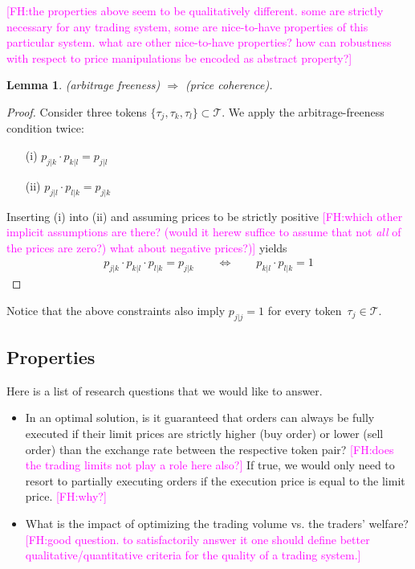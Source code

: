 \documentclass[11pt,parskip=full]{scrartcl}%
\newcommand*{\tokens}{\mathcal{T}}          %
\newtheorem{lemma}[theorem]{Lemma}
\newcommand{\FH}[1]{\textcolor{magenta}{[FH:#1]}}
\begin{document}
\FH{the properties above seem to be qualitatively different. some are strictly necessary for any trading system, some are nice-to-have properties of this particular system. what are other nice-to-have properties? how can robustness with respect to price manipulations be encoded as abstract property?}

\vspace{.6cm}
\begin{lemma}
  (arbitrage freeness) $ \Rightarrow $ (price coherence).
\end{lemma}
\vspace{-.8cm}
\begin{proof}
  Consider three tokens $ \{\tau_j,\tau_k,\tau_l\} \subset \tokens $.
  We apply the arbitrage-freeness condition twice:
  \begin{itemize}
    \item[(i)] $ p_{j|k} \cdot p_{k|l} = p_{j|l} $
    \item[(ii)] $ p_{j|l} \cdot p_{l|k} = p_{j|k} $
  \end{itemize}
  Inserting (i) into (ii) and assuming prices to be strictly positive \FH{which other implicit assumptions are there? (would it herew suffice to assume that not \emph{all} of the prices are zero?) what about negative prices?)} yields
  \begin{align*}
    p_{j|k} \cdot p_{k|l} \cdot p_{l|k} = p_{j|k}
    \qquad \Leftrightarrow \qquad
    p_{k|l} \cdot p_{l|k} = 1
  \end{align*}
\end{proof}
\vspace{-.4cm}

Notice that the above constraints also imply $ p_{j|j} = 1 $ for every
token~$ \tau_j \in \tokens $.

\subsection{Properties}
\label{subsec:properties}

Here is a list of research questions that we would like to answer.

\begin{itemize}
  \item In an optimal solution, is it guaranteed that orders can always be fully executed if their
  limit prices are strictly higher (buy order) or lower (sell order) than the exchange rate between
  the respective token pair? \FH{does the trading limits not play a role here also?}
  If true, we would only need to resort to partially executing orders if the execution price is
  equal to the limit price. \FH{why?}
  \item What is the impact of optimizing the trading volume vs. the traders' welfare? \FH{good question. to satisfactorily answer it one should define better qualitative/quantitative criteria for the quality of a trading system.}
\end{itemize}
\end{document}
